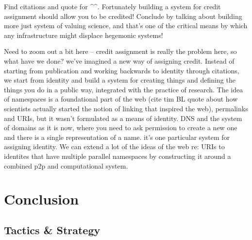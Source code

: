 \documentclass[10pt]{article}
\begin{document}
\begin{multicols}{2}
Find citations and quote for \^{}\^{}. Fortunately building a system for
credit assignment should allow you to be credited! Conclude by talking
about building more just system of valuing science, and that's one of
the critical means by which any infrastructure might displace hegemonic
systems!

Need to zoom out a bit here -- credit assignment is really the problem
here, so what have we done? we've imagined a new way of assigning
credit. Instead of starting from publication and working backwards to
identity through citations, we start from identity and build a system
for creating things and defining the things you do in a public way,
integrated with the practice of research. The idea of namespaces is a
foundational part of the web (cite tim BL quote about how scientists
actually started the notion of linking that inspired the web),
permalinks and URIs, but it wasn't formulated as a means of identity.
DNS and the system of domains as it is now, where you need to ask
permission to create a new one and there is a single representation of a
name. it's one particular system for assigning identity. We can extend a
lot of the ideas of the web re: URIs to identites that have multiple
parallel namespaces by constructing it around a combined p2p and
computational system.


\end{multicols}


\hypertarget{conclusion}{%
\section{Conclusion}\label{conclusion}}


\begin{multicols}{2}



\end{multicols}


\hypertarget{tactics-strategy}{%
\subsection{Tactics \& Strategy}\label{tactics-strategy}}
\end{document}
